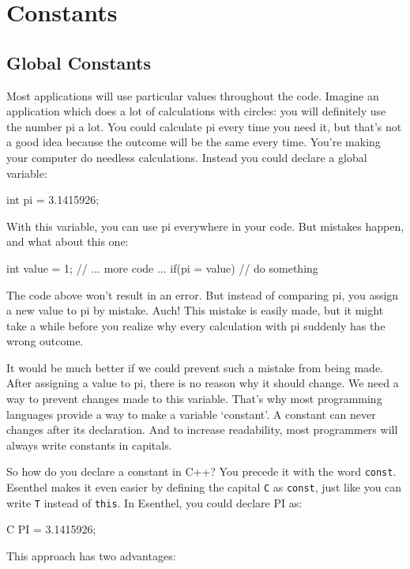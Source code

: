 \chapter{Constants}
\section{Global Constants}
Most applications will use particular values throughout the code. Imagine an application which does a lot of calculations with circles: you will definitely use the number pi a lot. You could calculate pi every time you need it, but that's not a good idea because the outcome will be the same every time. You're making your computer do needless calculations. Instead you could declare a global variable:

\begin{code}
int pi = 3.1415926;
\end{code}

With this variable, you can use pi everywhere in your code. But mistakes happen, and what about this one:

\begin{code}
int value = 1;
// ... more code ...
if(pi = value) {
  // do something
}
\end{code}

The code above won't result in an error. But instead of comparing pi, you assign a new value to pi by mistake. Auch! This mistake is easily made, but it might take a while before you realize why every calculation with pi suddenly has the wrong outcome.

It would be much better if we could prevent such a mistake from being made. After assigning a value to pi, there is no reason why it should change. We need a way to prevent changes made to this variable. That's why most programming languages provide a way to make a variable `constant'. A constant can never changes after its declaration. And to increase readability, most programmers will always write constants in capitals.

So how do you declare a constant in C++? You precede it with the word \verb|const|. Esenthel makes it even easier by defining the capital \verb|C| as \verb|const|, just like you can write \verb|T| instead of \verb|this|. In Esenthel, you could declare PI as:

\begin{code}
C PI = 3.1415926;
\end{code}

This approach has two advantages:

